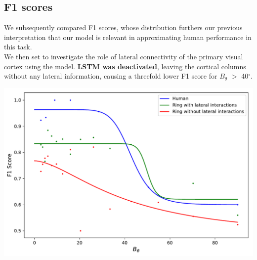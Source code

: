\documentclass[a0,portrait]{a0poster}
\begin{document}
\begin{multicols}{3}
\subsection*{F1 scores}
We subsequently compared F1 scores, whose distribution furthers our previous interpretation that our model is relevant in approximating human performance in this task.
\\ We then set to investigate the role of lateral connectivity of the primary visual cortex using the model. \textbf{LSTM was deactivated}, leaving the cortical columns without any lateral information, causing a threefold lower F1 score for $B_\theta$ $>$ 40$^\circ$. 
\begin{center}\vspace{1cm}
\includegraphics[width=1.\linewidth, page=1]{F1_curve.pdf}
\end{center}\vspace{1cm}




\color{Navy} %


\end{multicols}
\end{document}
